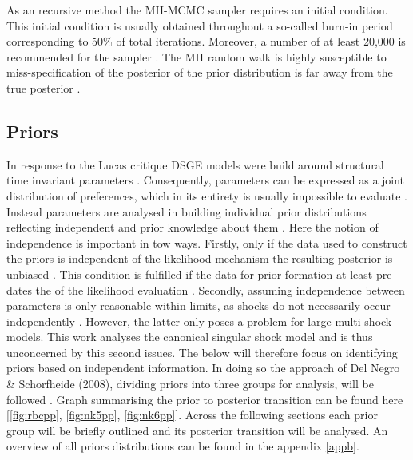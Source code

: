 \documentclass[12pt,a4paper,english]{article} %
\begin{document}
	As an recursive method the MH-MCMC sampler requires an initial condition. This initial condition is usually obtained throughout a so-called burn-in period corresponding to 50\% of total iterations. Moreover, a number of at least 20,000 is recommended for the sampler \cite{herbst_bayesian_2016}.
	The MH random walk is highly susceptible to miss-specification of the posterior of the prior distribution is far away from the true posterior \cite{herbst_bayesian_2016}.
			
	\subsection{Priors}
	In response to the Lucas critique \ac{DSGE} models were build around structural time invariant parameters \cite{lucas_jr_tobin_1981}. Consequently, parameters can be expressed as a joint distribution of preferences, which in its entirety is usually impossible to evaluate \cite{del_negro_forming_2008}. Instead parameters are analysed in building individual prior distributions reflecting independent and prior knowledge about them \cite{del_negro_forming_2008}. Here the notion of independence is important in tow ways. Firstly, only if the data used to construct the priors is independent of the likelihood mechanism the resulting posterior is unbiased \cite{del_negro_forming_2008}. This condition is fulfilled if the data for prior formation at least pre-dates the of the likelihood evaluation \cite{herbst_bayesian_2016}. Secondly, assuming independence between parameters is only reasonable within limits, as shocks do not necessarily occur independently \cite{herbst_bayesian_2016}. However, the latter only poses a problem for large multi-shock models. This work analyses the canonical singular shock model and is thus unconcerned by this second issues. The below will therefore focus on identifying priors based on independent information. In doing so the approach of Del Negro \& Schorfheide (2008), dividing priors into three groups for analysis, will be followed \cite{del_negro_forming_2008}. Graph summarising the prior to posterior transition can be found here [\ref{fig:rbcpp}, \ref{fig:nk5pp}, \ref{fig:nk6pp}]. Across the following sections each prior group will be briefly outlined and its posterior transition will be analysed. An overview of all priors distributions can be found in the appendix \ref{appb}. 
	
\end{document}
